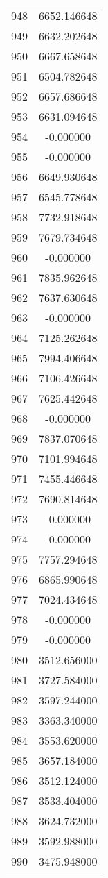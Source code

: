 \documentclass[12pt]{article}
\begin{document}
\begin{longtable}{@{}cc@{}}
948 & 6652.146648 \\
949 & 6632.202648 \\
950 & 6667.658648 \\
951 & 6504.782648 \\
952 & 6657.686648 \\
953 & 6631.094648 \\
954 & -0.000000 \\
955 & -0.000000 \\
956 & 6649.930648 \\
957 & 6545.778648 \\
958 & 7732.918648 \\
959 & 7679.734648 \\
960 & -0.000000 \\
961 & 7835.962648 \\
962 & 7637.630648 \\
963 & -0.000000 \\
964 & 7125.262648 \\
965 & 7994.406648 \\
966 & 7106.426648 \\
967 & 7625.442648 \\
968 & -0.000000 \\
969 & 7837.070648 \\
970 & 7101.994648 \\
971 & 7455.446648 \\
972 & 7690.814648 \\
973 & -0.000000 \\
974 & -0.000000 \\
975 & 7757.294648 \\
976 & 6865.990648 \\
977 & 7024.434648 \\
978 & -0.000000 \\
979 & -0.000000 \\
980 & 3512.656000 \\
981 & 3727.584000 \\
982 & 3597.244000 \\
983 & 3363.340000 \\
984 & 3553.620000 \\
985 & 3657.184000 \\
986 & 3512.124000 \\
987 & 3533.404000 \\
988 & 3624.732000 \\
989 & 3592.988000 \\
990 & 3475.948000 \\

\end{longtable}
\end{document}
